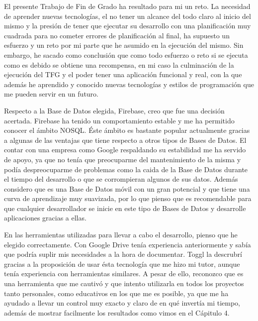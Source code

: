 \documentclass[11pt,openany]{book}
\begin{document}
El presente Trabajo de Fin de Grado ha resultado para mi un reto. La necesidad de aprender nuevas tecnologías, el no tener un alcance del todo claro al inicio del mismo y la presión de tener que ejecutar su desarrollo con una planificación muy cuadrada para no cometer errores de planificación al final, ha supuesto un esfuerzo y un reto por mi parte que he asumido en la ejecución del mismo. Sin embargo, he sacado como conclusión que como todo esfuerzo o reto si se ejecuta como es debido se obtiene una recompensa, en mi caso la culminación de la ejecución del TFG y el poder tener una aplicación funcional y real, con la que además he aprendido y conocido nuevas tecnologías y estilos de programación que me pueden servir en un futuro. 

Respecto a la Base de Datos elegida, Firebase, creo que fue una decisión acertada. Firebase ha tenido un comportamiento estable y me ha permitido conocer el ámbito NOSQL. Éste ámbito es bastante popular actualmente gracias a algunas de las ventajas que tiene respecto a otros tipos de Bases de Datos. El contar con una empresa como Google respaldando su estabilidad me ha servido de apoyo, ya que no tenía que preocuparme del mantenimiento de la misma y podía despreocuparme de problemas como la caida de la Base de Datos durante el tiempo del desarrollo o que se corrompieran algunos de sus datos. Además considero que es una Base de Datos móvil con un gran potencial y que tiene una curva de aprendizaje muy suavizada, por lo que pienso que es recomendable para que cualquier desarrollador se inicie en este tipo de Bases de Datos y desarrolle aplicaciones gracias a ellas.

En las herramientas utilizadas para llevar a cabo el desarrollo, pienso que he elegido correctamente. Con Google Drive tenía experiencia anteriormente y sabía que podría suplir mis necesidades a la hora de documentar. Toggl la descrubrí gracias a la proposición de usar ésta tecnología que me hizo mi tutor, aunque tenía experiencia con herramientas similares. A pesar de ello, reconozco que es una herramienta que me cautivó y que intento utilizarla en todos los proyectos tanto personales, como educativos en los que me es posible, ya que me ha ayudado a llevar un control muy exacto y claro de en qué invertía mi tiempo, además de mostrar facilmente los resultados como vimos en el Cápitulo 4.
\end{document}
